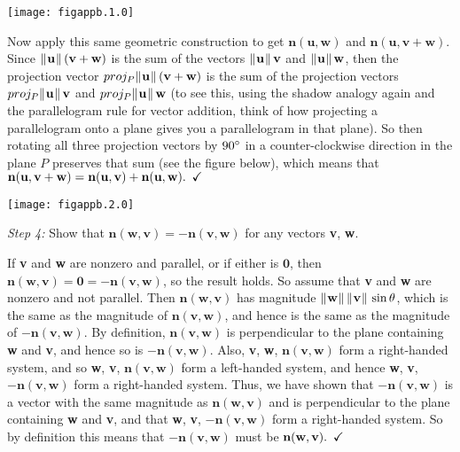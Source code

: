 \begin{center}
 \texttt{[image: figappb.1.0]}
\end{center}

Now apply this same geometric construction to get $\textbf{n}(\textbf{u},\textbf{w})$ and
$\textbf{n}(\textbf{u},\textbf{v} + \textbf{w})$. Since $\lVert\mspace{1mu}\textbf{u}\mspace{1mu}\rVert\,(\textbf{v} + \textbf{w})$ is the sum of
the vectors $\lVert\mspace{1mu}\textbf{u}\mspace{1mu}\rVert\,\textbf{v}$ and $\lVert\mspace{1mu}\textbf{u}\mspace{1mu}\rVert\,\textbf{w}$, then the projection vector
$proj_{P} \lVert\mspace{1mu}\textbf{u}\mspace{1mu}\rVert\,(\textbf{v} + \textbf{w})$ is the sum of the projection vectors
$proj_{P} \lVert\mspace{1mu}\textbf{u}\mspace{1mu}\rVert\,\textbf{v}$ and $proj_{P} \lVert\mspace{1mu}\textbf{u}\mspace{1mu}\rVert\,\textbf{w}$ (to see this, using the shadow
analogy again and the parallelogram rule for vector addition, think of how projecting a parallelogram onto a plane
gives you a parallelogram in that plane). So then rotating all three projection vectors by $90^\circ$ in a
counter-clockwise direction in the plane $P$ preserves that sum (see the figure below), which means that
$\textbf{n}(\textbf{u},\textbf{v} + \textbf{w}) = \textbf{n}(\textbf{u},\textbf{v}) +
\textbf{n}(\textbf{u},\textbf{w}).\enskip\checkmark$\vspace{6mm}

\begin{center}
 \texttt{[image: figappb.2.0]}
\end{center}\vspace{6mm}

\par\noindent \emph{Step 4:} Show that $\textbf{n}(\textbf{w},\textbf{v}) = -\textbf{n}(\textbf{v},\textbf{w})$ for any
vectors \textbf{v}, \textbf{w}.\vspace{1mm}
\par\noindent If \textbf{v} and \textbf{w} are nonzero and parallel, or if either is $\textbf{0}$, then
$\textbf{n}(\textbf{w},\textbf{v}) = \textbf{0} = -\textbf{n}(\textbf{v},\textbf{w})$, so the result holds. So assume
that \textbf{v} and \textbf{w} are nonzero and not parallel. Then $\textbf{n}(\textbf{w},\textbf{v})$ has magnitude
$\lVert\mspace{1mu}\textbf{w}\mspace{1mu}\rVert\,\lVert\mspace{1mu}\textbf{v}\mspace{1mu}\rVert\,\sin \theta$, which is the same as the magnitude of
$\textbf{n}(\textbf{v},\textbf{w})$, and hence is the same as the magnitude of $-\textbf{n}(\textbf{v},\textbf{w})$.
By definition, $\textbf{n}(\textbf{v},\textbf{w})$ is perpendicular to the plane containing \textbf{w} and
\textbf{v}, and hence so is $-\textbf{n}(\textbf{v},\textbf{w})$. Also, \textbf{v}, \textbf{w},
$\textbf{n}(\textbf{v},\textbf{w})$ form a right-handed system, and so \textbf{w}, \textbf{v},
$\textbf{n}(\textbf{v},\textbf{w})$ form a left-handed system, and hence \textbf{w}, \textbf{v},
$-\textbf{n}(\textbf{v},\textbf{w})$ form a right-handed system. Thus, we have shown that
$-\textbf{n}(\textbf{v},\textbf{w})$ is a vector with the same magnitude as $\textbf{n}(\textbf{w},\textbf{v})$ and is
perpendicular to the plane containing \textbf{w} and \textbf{v}, and that \textbf{w}, \textbf{v},
$-\textbf{n}(\textbf{v},\textbf{w})$ form a right-handed system. So by definition this means that
$-\textbf{n}(\textbf{v},\textbf{w})$ must be $\textbf{n}(\textbf{w},\textbf{v}). \enskip\checkmark$\\

